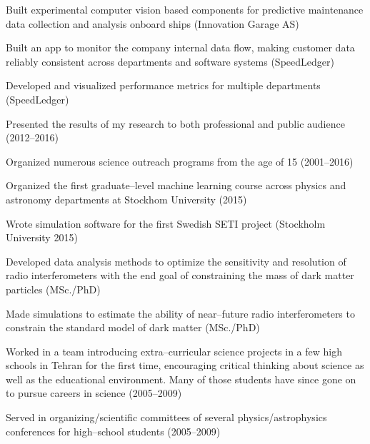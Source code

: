 
  \begin{cvitems}
    \vspace{.5\baselineskip}
    \item \small{Built experimental computer vision based components for predictive maintenance data collection and analysis onboard ships (Innovation Garage AS)}

    \item \small{Built an app to monitor the company internal data
      flow, making customer data reliably consistent across
      departments and software systems (SpeedLedger)}

    \item \small{Developed and visualized performance metrics for
      multiple departments (SpeedLedger)}

    \item \small{Presented the results of my research to both
      professional and public audience (2012--2016)}

    \item \small{Organized numerous science outreach programs from the
      age of 15 (2001--2016)}

    \item \small{Organized the first graduate--level machine learning
      course across physics and astronomy departments at Stockhom
      University (2015)}

    \item \small{Wrote simulation software for the first Swedish SETI
      project (Stockholm University 2015)}

    \item \small{Developed data analysis methods to optimize the
      sensitivity and resolution of radio interferometers with the end
      goal of constraining the mass of dark matter particles
      (MSc./PhD)}

    \item \small{Made simulations to estimate the ability of
      near--future radio interferometers to constrain the standard
      model of dark matter (MSc./PhD)}

    \item \small{Worked in a team introducing extra--curricular science
      projects in a few high schools in Tehran for the first time,
      encouraging critical thinking about science as well as the
      educational environment. Many of those students have since gone
      on to pursue careers in science (2005--2009)}

    \item \small{Served in organizing/scientific committees of several
      physics/astrophysics conferences for high--school students
      (2005--2009)}

  \end{cvitems}
